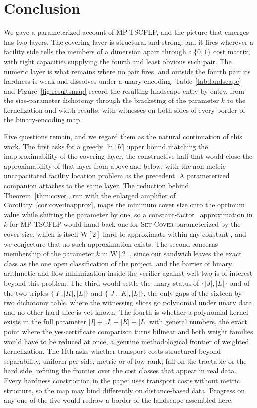 \section{Conclusion}\label{sec:conclusion}

We gave a parameterized account of MP-TSCFLP, and the picture that
emerges has two layers. The covering layer is structural and strong,
and it fires wherever a facility side tells the members of a dimension
apart through a $\{0,1\}$ cost matrix, with tight capacities supplying
the fourth and least obvious such pair. The numeric layer is what
remains where no pair fires, and outside the fourth pair its hardness
is weak and dissolves under a unary encoding.
Table~\ref{tab:landscape} and Figure~\ref{fig:resultsmap} record the
resulting landscape entry by entry, from the size-parameter dichotomy
through the bracketing of the parameter $k$ to the kernelization and
width results, with witnesses on both sides of every border of the
binary-encoding map.

Five questions remain, and we regard them as the natural continuation of
this work. The first asks for a greedy $\ln|K|$ upper bound matching the
inapproximability of the covering layer, the constructive half that would
close the approximability of that layer from above and below, with the
non-metric uncapacitated facility location problem \citep{Hochbaum1982} as the
precedent. A parameterized companion attaches to the same layer. The
reduction behind Theorem~\ref{thm:cover}, run with the enlarged
amplifier of Corollary~\ref{cor:coverinapprox}, maps the minimum cover
size onto the optimum value while shifting the parameter by one, so a
constant-factor \FPT\ approximation in $k$ for MP-TSCFLP would hand
back one for \textsc{Set Cover} parameterized by the cover size, which
is itself $\mathrm W[2]$-hard to approximate within any constant
\citep{LinRenSunWang2023}, and we conjecture that no such approximation
exists. The second concerns membership of the parameter $k$ in $\mathrm
W[2]$, since our sandwich leaves the exact class as the one open
classification of the project, and the barrier of binary arithmetic and
flow minimization inside the verifier against weft two is of interest
beyond this problem. The third would settle the unary status of $\{|J|,|L|\}$ and
of the two triples $\{|I|,|K|,|L|\}$ and $\{|J|,|K|,|L|\}$, the only gaps
of the sixteen-by-two dichotomy table, where the witnessing slices go
polynomial under unary data and no other hard slice is yet known. The
fourth is whether a polynomial kernel exists in the full parameter
$|I|+|J|+|K|+|L|$ with general numbers, the exact point where the
yes-certificate comparison turns bilinear and both weight families would
have to be reduced at once, a genuine methodological frontier of weighted
kernelization. The fifth asks whether transport costs structured
beyond separability, uniform per side, metric or of low rank, fall on the
tractable or the hard side, refining the frontier over the cost classes
that appear in real data. Every hardness construction in the paper uses
transport costs without metric structure, so the map may bind
differently on distance-based data. Progress on any one of the five would redraw a
border of the landscape assembled here.

